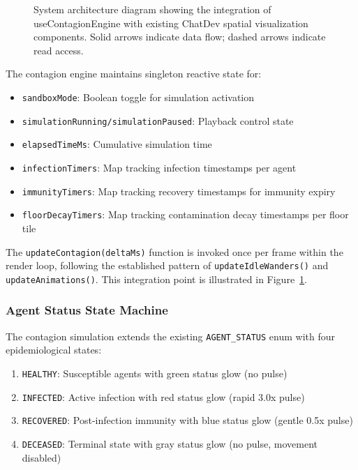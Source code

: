 \begin{figure}[t]
\caption{System architecture diagram showing the integration of useContagionEngine with existing ChatDev spatial visualization components. Solid arrows indicate data flow; dashed arrows indicate read access.}
\label{fig:architecture}
\end{figure}

The contagion engine maintains singleton reactive state for:
\begin{itemize}
    \item \texttt{sandboxMode}: Boolean toggle for simulation activation
    \item \texttt{simulationRunning/simulationPaused}: Playback control state
    \item \texttt{elapsedTimeMs}: Cumulative simulation time
    \item \texttt{infectionTimers}: Map tracking infection timestamps per agent
    \item \texttt{immunityTimers}: Map tracking recovery timestamps for immunity expiry
    \item \texttt{floorDecayTimers}: Map tracking contamination decay timestamps per floor tile
\end{itemize}

The \texttt{updateContagion(deltaMs)} function is invoked once per frame within the render loop, following the established pattern of \texttt{updateIdleWanders()} and \texttt{updateAnimations()}. This integration point is illustrated in Figure~\ref{fig:architecture}.

\subsubsection{Agent Status State Machine}
\label{sec:status-machine}

The contagion simulation extends the existing \texttt{AGENT\_STATUS} enum with four epidemiological states:

\begin{enumerate}
    \item \texttt{HEALTHY}: Susceptible agents with green status glow (no pulse)
    \item \texttt{INFECTED}: Active infection with red status glow (rapid 3.0x pulse)
    \item \texttt{RECOVERED}: Post-infection immunity with blue status glow (gentle 0.5x pulse)
    \item \texttt{DECEASED}: Terminal state with gray status glow (no pulse, movement disabled)
\end{enumerate}

